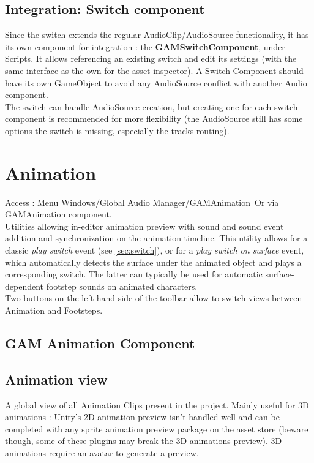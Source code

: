 \documentclass[a4paper,10pt]{article}
\begin{document}
\subsection{Integration: Switch component}
Since the switch extends the regular AudioClip/AudioSource functionality, it has its own component for integration : the \textbf{GAMSwitchComponent}, under Scripts. It allows referencing an existing switch and edit its settings (with the same interface as the own for the asset inspector). A Switch Component should have its own GameObject to avoid any AudioSource conflict with another Audio component. \\
The switch can handle AudioSource creation, but creating one for each switch component is recommended for more flexibility (the AudioSource still has some options the switch is missing, especially the tracks routing).


\section{Animation}

Access : Menu Windows/Global Audio Manager/GAMAnimation\
Or via GAMAnimation component.\\

Utilities allowing in-editor animation preview with sound and sound event addition and synchronization on the animation timeline. This utility allows for a classic \textit{play switch} event (see \autoref{sec:switch}), or for a \textit{play switch on surface} event, which automatically detects the surface under the animated object and plays a corresponding switch. The latter can typically be used for automatic surface-dependent footstep sounds on animated characters. \\
Two buttons on the left-hand side of the toolbar allow to switch views between Animation and Footsteps.

\subsection{GAM Animation Component}

\subsection{Animation view}
A global view of all Animation Clips present in the project. Mainly useful for 3D animations : Unity's 2D animation preview isn't handled well and can be completed with any sprite animation preview package on the asset store (beware though, some of these plugins may break the 3D animations preview). 3D animations require an avatar to generate a preview.
\end{document}
